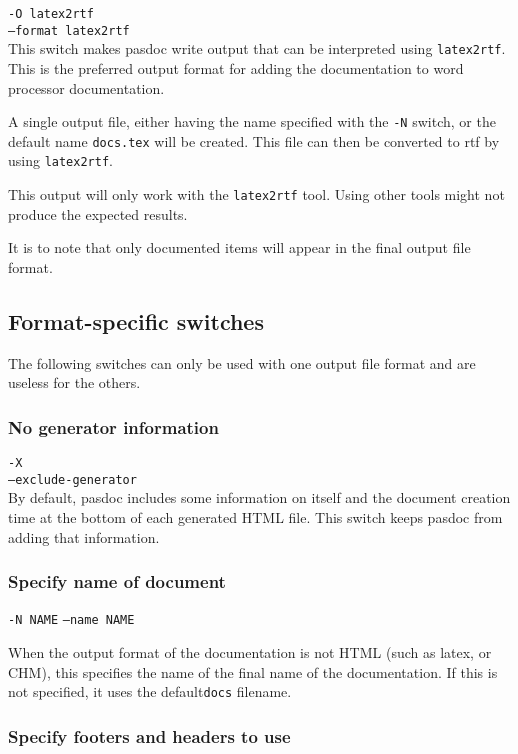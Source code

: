 \documentclass[11pt]{article}
\begin{document}
{\tt -O latex2rtf}\\
{\tt --format latex2rtf}\\

This switch makes pasdoc write output that can be interpreted using
{\tt latex2rtf}. This is the preferred output format for adding
the documentation to word processor documentation.

A single output file, either having the name specified with
the {\tt -N} switch, or the default name {\tt docs.tex} will
be created. This file can then be converted to rtf by using
{\tt latex2rtf}.

This output will only work with the {\tt latex2rtf} tool. Using
other tools might not produce the expected results. 

It is to note that only documented items will appear in the final
output file format.


\subsection{Format-specific switches}

The following switches can only be used with one output file format
and are useless for the others.

\subsubsection{No generator information}

{\tt -X}\\
{\tt --exclude-generator}\\

By default, pasdoc includes some information on itself and the document
creation time at the bottom of each generated HTML file.
This switch keeps pasdoc from adding that information.

\subsubsection{Specify name of document}
{\tt -N NAME}
{\tt --name NAME}

When the output format of the documentation is not
HTML (such as latex, or CHM), this specifies the
name of the final name of the documentation. If this
is not specified, it uses the default{\tt  docs} 
filename.



\subsubsection{Specify footers and headers to use}
\end{document}
